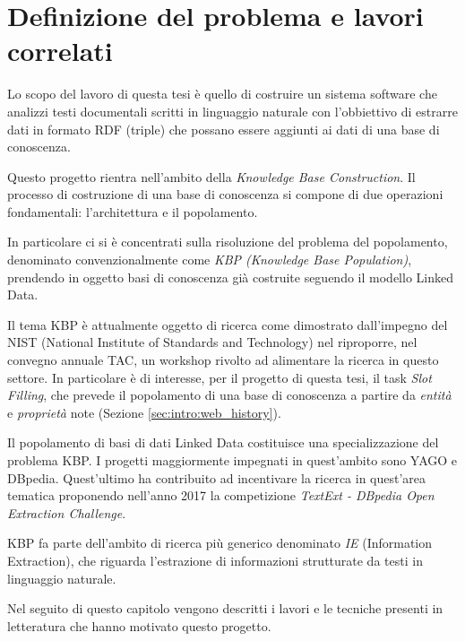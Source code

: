 %
\chapter{Definizione del problema e lavori correlati}
\label{sec:literature_review}

Lo scopo del lavoro di questa tesi è quello di costruire un sistema software che analizzi testi documentali scritti in linguaggio naturale con l'obbiettivo di estrarre dati in formato RDF (triple) che possano essere aggiunti ai dati di una base di conoscenza.

Questo progetto rientra nell'ambito della \textit{Knowledge Base Construction}.
Il processo di costruzione di una base di conoscenza si compone di due operazioni fondamentali: l'architettura e il popolamento. 

In particolare ci si è concentrati sulla risoluzione del problema del popolamento, denominato convenzionalmente come \textit{KBP (Knowledge Base Population)}, prendendo in oggetto basi di conoscenza già costruite seguendo il modello Linked Data.

Il tema KBP è attualmente oggetto di ricerca come dimostrato dall'impegno del NIST (National Institute of Standards and Technology) nel riproporre, nel convegno annuale TAC\cite{TAC}, un workshop rivolto ad alimentare la ricerca in questo settore. In particolare è di interesse, per il progetto di questa tesi, il task \textit{Slot Filling}, che prevede il popolamento di una base di conoscenza a partire da \textit{entità} e \textit{proprietà} note (Sezione \ref{sec:intro:web_history}).

Il popolamento di basi di dati Linked Data costituisce una specializzazione del problema KBP. I progetti maggiormente impegnati in quest'ambito sono YAGO\cite{Suchanek2007YagoAC} e DBpedia\cite{Lehmann2015DBpediaA}. Quest'ultimo ha contribuito ad incentivare la ricerca in quest'area tematica proponendo nell'anno 2017 la competizione \textit{TextExt - DBpedia Open Extraction Challenge}\cite{DBpedia_TextExt}.

KBP fa parte dell'ambito di ricerca più generico denominato \textit{IE} (Information Extraction), che riguarda l'estrazione di informazioni strutturate da testi in linguaggio naturale.

Nel seguito di questo capitolo vengono descritti i lavori e le tecniche presenti in letteratura che hanno motivato questo progetto.



